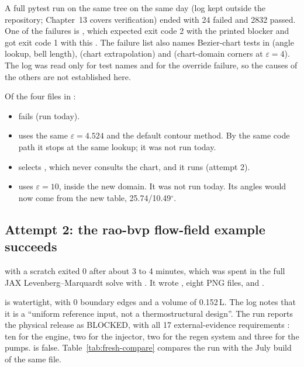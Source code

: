 A full pytest run on the same tree on the same day (log kept outside the repository; Chapter~13 covers verification) ended with 24 failed and 2832 passed. One of the failures is , which expected exit code 2 with the printed blocker and got exit code 1 with this . The failure list also names Bezier-chart tests in  (angle lookup, bell length),  (chart extrapolation) and  (chart-domain corners at $\varepsilon = 4$). The log was read only for test names and for the override failure, so the causes of the others are not established here.

Of the four  files in :
\begin{itemize}
\item {} fails (run today).
\item {} uses the same $\varepsilon = 4.524$ and the default contour method. By the same code path it stops at the same lookup; it was not run today.
\item {} selects , which never consults the chart, and it runs (attempt 2).
\item {} uses $\varepsilon = 10$, inside the new domain. It was not run today. Its angles would now come from the new table, 25.74/10.49$^\circ$.
\end{itemize}

\subsection{Attempt 2: the rao-bvp flow-field example succeeds}\label{sec:fresh-run-success}

      with a scratch  exited 0 after about 3 to 4 minutes, which was spent in the full JAX Levenberg--Marquardt solve with  \code{=} . It wrote , eight PNG files,  and .

 is watertight, with 0 boundary edges and a volume of 0.152\,L. The log notes that it is a ``uniform reference input, not a thermostructural design''. The run reports the physical release as BLOCKED, with all 17 external-evidence requirements : ten for the engine, two for the injector, two for the regen system and three for the pumps.  is false. Table~\ref{tab:fresh-compare} compares the run with the July build of the same file.

